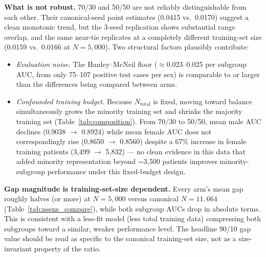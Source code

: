\documentclass[11pt]{article}
\begin{document}
\textbf{What is not robust.} 70/30 and 50/50 are not reliably distinguishable from each other. Their canonical-seed point estimates (0.0415 vs.\ 0.0170) suggest a clean monotonic trend, but the 3-seed replication shows substantial range overlap, and the same near-tie replicates at a completely different training-set size (0.0159 vs.\ 0.0166 at $N=5{,}000$). Two structural factors plausibly contribute:
\begin{itemize}
\item \emph{Evaluation noise.} The Hanley--McNeil floor ($\approx$0.023--0.025 per subgroup AUC, from only 75--107 positive test cases per sex) is comparable to or larger than the differences being compared between arms.
\item \emph{Confounded training budget.} Because $N_{\text{total}}$ is fixed, moving toward balance simultaneously grows the minority training set and shrinks the majority training set (Table~\ref{tab:composition}). From 70/30 to 50/50, mean male AUC declines (0.9038 $\to$ 0.8924) while mean female AUC does not correspondingly rise (0.8650 $\to$ 0.8560) despite a 67\% increase in female training patients (3{,}499 $\to$ 5{,}832) — no clean evidence in this data that added minority representation beyond $\sim$3{,}500 patients improves minority-subgroup performance under this fixed-budget design.
\end{itemize}

\textbf{Gap magnitude is training-set-size dependent.} Every arm's mean gap roughly halves (or more) at $N=5{,}000$ versus canonical $N=11{,}664$ (Table~\ref{tab:nsens_compare}), while both subgroup AUCs drop in absolute terms. This is consistent with a less-fit model (less total training data) compressing both subgroups toward a similar, weaker performance level. The headline 90/10 gap value should be read as specific to the canonical training-set size, not as a size-invariant property of the ratio.
\end{document}
